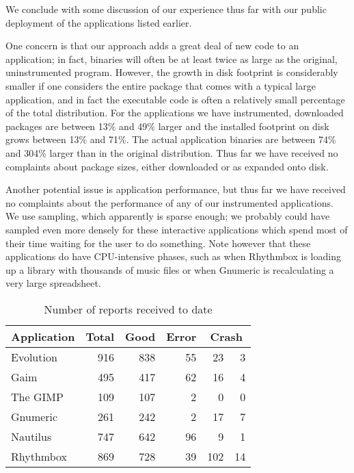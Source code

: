 \documentclass[10pt,twocolumn]{article}
\newcommand{\evolution}{Evolution\xspace}
\newcommand{\gaim}{Gaim\xspace}
\newcommand{\gimp}{The GIMP\xspace}
\newcommand{\gnumeric}{Gnumeric\xspace}
\newcommand{\nautilus}{Nautilus\xspace}
\newcommand{\rhythmbox}{Rhythmbox\xspace}
\newcommand{\header}[1]{\multicolumn{1}{c}{\textbf{#1}}}
\begin{document}
We conclude with some discussion of our experience thus far with our public
deployment of the applications listed earlier.

One concern is that our approach adds a great deal of new code
to an application; in fact, binaries will often be at least twice as
large as the original, uninstrumented program.  However, the growth in
disk footprint is considerably smaller if one considers the entire
package that comes with a typical large application, and in fact the
executable code is often a relatively small percentage of the total
distribution.  For the applications we have instrumented, downloaded
packages are between 13\% and 49\% larger and the installed footprint
on disk grows between 13\% and 71\%.  The actual application binaries
are between 74\% and 304\% larger than in the original distribution.
Thus far we have received no complaints about package sizes, either
downloaded or as expanded onto disk.

Another potential issue is application performance, but thus far we
have received no complaints about the performance of any of our
instrumented applications.  We use  sampling, which
apparently is sparse enough; we probably could have sampled even more
densely for these interactive applications which spend most of their
time waiting for the user to do something.  Note however that 
these applications do have CPU-intensive phases, such as when
\rhythmbox is loading up a library with thousands of music files or
when \gnumeric is recalculating a very large spreadsheet.

\begin{table}
  \centering
  \begin{tabular}{lrrrr@{~(}r@{\%)}}
    \header{Application} & \header{Total} & \header{Good} & \header{Error} & \multicolumn{2}{c}{\textbf{Crash}} \\ \hline
    \evolution & 916 & 838 & 55 & 23 & 3 \\
    \gaim & 495 & 417 & 62 & 16 & 4 \\
    \gimp & 109 & 107 & 2 & 0 & 0 \\
    \gnumeric & 261 & 242 & 2 & 17 & 7 \\
    \nautilus & 747 & 642 & 96 & 9 & 1 \\
    \rhythmbox & 869 & 728 & 39 & 102 & 14
  \end{tabular}
  \caption{Number of reports received to date}
  \label{reports-per-app}
\end{table}
\end{document}
